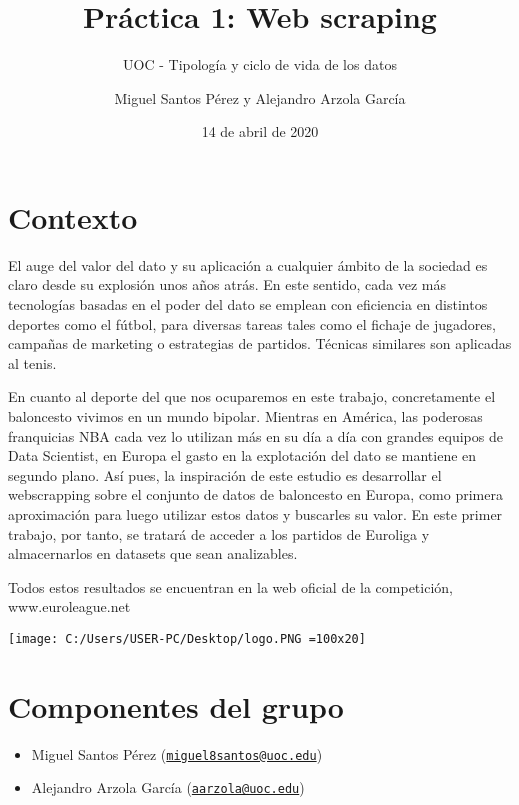 \documentclass[]{article}
\title{Práctica 1: Web scraping}
\subtitle{UOC - Tipología y ciclo de vida de los datos}
\author{Miguel Santos Pérez y Alejandro Arzola García}
\date{14 de abril de 2020}
\providecommand{\tightlist}{%
  \setlength{\itemsep}{0pt}\setlength{\parskip}{0pt}}
\begin{document}
\maketitle

{
\setcounter{tocdepth}{2}
\tableofcontents
}
\newpage

\hypertarget{contexto}{%
\section{Contexto}\label{contexto}}

El auge del valor del dato y su aplicación a cualquier ámbito de la
sociedad es claro desde su explosión unos años atrás. En este sentido,
cada vez más tecnologías basadas en el poder del dato se emplean con
eficiencia en distintos deportes como el fútbol, para diversas tareas
tales como el fichaje de jugadores, campañas de marketing o estrategias
de partidos. Técnicas similares son aplicadas al tenis.

En cuanto al deporte del que nos ocuparemos en este trabajo,
concretamente el baloncesto vivimos en un mundo bipolar. Mientras en
América, las poderosas franquicias NBA cada vez lo utilizan más en su
día a día con grandes equipos de Data Scientist, en Europa el gasto en
la explotación del dato se mantiene en segundo plano. Así pues, la
inspiración de este estudio es desarrollar el webscrapping sobre el
conjunto de datos de baloncesto en Europa, como primera aproximación
para luego utilizar estos datos y buscarles su valor. En este primer
trabajo, por tanto, se tratará de acceder a los partidos de Euroliga y
almacernarlos en datasets que sean analizables.

Todos estos resultados se encuentran en la web oficial de la
competición, www.euroleague.net

\texttt{[image: C:/Users/USER-PC/Desktop/logo.PNG =100x20]}

\hypertarget{componentes-del-grupo}{%
\section{Componentes del grupo}\label{componentes-del-grupo}}

\begin{itemize}
\tightlist
\item
  Miguel Santos Pérez
  (\href{mailto:miguel8santos@uoc.edu}{\nolinkurl{miguel8santos@uoc.edu}})
\item
  Alejandro Arzola García
  (\href{mailto:aarzola@uoc.edu}{\nolinkurl{aarzola@uoc.edu}})
\end{itemize}
\end{document}
